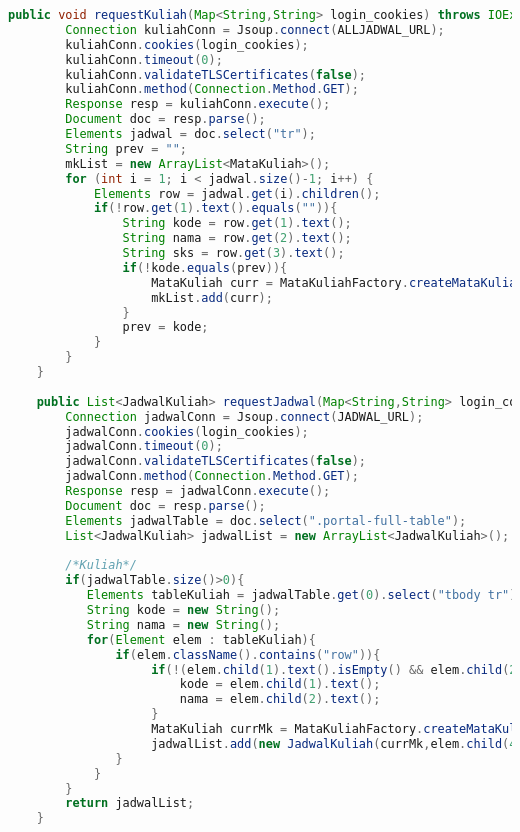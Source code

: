\begin{lstlisting}[language=Java,basicstyle=\tiny,caption=Scraper.java]
    public void requestKuliah(Map<String,String> login_cookies) throws IOException{
        Connection kuliahConn = Jsoup.connect(ALLJADWAL_URL);
        kuliahConn.cookies(login_cookies);
        kuliahConn.timeout(0);
        kuliahConn.validateTLSCertificates(false); 
        kuliahConn.method(Connection.Method.GET);
        Response resp = kuliahConn.execute();
        Document doc = resp.parse();
        Elements jadwal = doc.select("tr");
        String prev = "";
        mkList = new ArrayList<MataKuliah>();
        for (int i = 1; i < jadwal.size()-1; i++) {
            Elements row = jadwal.get(i).children();
            if(!row.get(1).text().equals("")){
                String kode = row.get(1).text();
                String nama = row.get(2).text();
                String sks = row.get(3).text();
                if(!kode.equals(prev)){
                    MataKuliah curr = MataKuliahFactory.createMataKuliah(kode, Integer.parseInt(sks), nama);
                    mkList.add(curr);
                }
                prev = kode;
            }   
        }    
    }
    
    public List<JadwalKuliah> requestJadwal(Map<String,String> login_cookies) throws IOException{
        Connection jadwalConn = Jsoup.connect(JADWAL_URL);
        jadwalConn.cookies(login_cookies);
        jadwalConn.timeout(0);
        jadwalConn.validateTLSCertificates(false); 
        jadwalConn.method(Connection.Method.GET);
        Response resp = jadwalConn.execute();
        Document doc = resp.parse();
        Elements jadwalTable = doc.select(".portal-full-table"); 
        List<JadwalKuliah> jadwalList = new ArrayList<JadwalKuliah>();
        
        /*Kuliah*/
        if(jadwalTable.size()>0){
           Elements tableKuliah = jadwalTable.get(0).select("tbody tr");
           String kode = new String(); 
           String nama = new String();
           for(Element elem : tableKuliah){
               if(elem.className().contains("row")){       
                    if(!(elem.child(1).text().isEmpty() && elem.child(2).text().isEmpty())){
                        kode = elem.child(1).text();
                        nama = elem.child(2).text();  
                    }  
                    MataKuliah currMk = MataKuliahFactory.createMataKuliah(kode, Integer.parseInt(elem.child(3).text()), nama);
                    jadwalList.add(new JadwalKuliah(currMk,elem.child(4).text().charAt(0),elem.child(5).text(),elem.child(7).text(),elem.child(8).text(),elem.child(9).text()));
               }
            }
        }      
        return jadwalList;
    }
    

\end{lstlisting}
